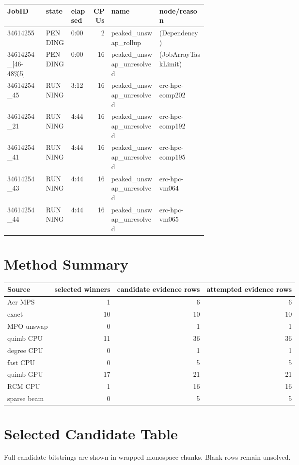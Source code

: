 \documentclass[10pt]{article}
\begin{document}
\begin{longtable}{l l l r p{0.24\linewidth} p{0.24\linewidth}}
\toprule
JobID & state & elapsed & CPUs & name & node/reason \\
\midrule
34614255 & PENDING & 0:00 & 2 & peaked\_unswap\_rollup & (Dependency) \\
34614254\_[46-48\%5] & PENDING & 0:00 & 16 & peaked\_unswap\_unresolved & (JobArrayTaskLimit) \\
34614254\_45 & RUNNING & 3:12 & 16 & peaked\_unswap\_unresolved & erc-hpc-comp202 \\
34614254\_21 & RUNNING & 4:44 & 16 & peaked\_unswap\_unresolved & erc-hpc-comp192 \\
34614254\_41 & RUNNING & 4:44 & 16 & peaked\_unswap\_unresolved & erc-hpc-comp195 \\
34614254\_43 & RUNNING & 4:44 & 16 & peaked\_unswap\_unresolved & erc-hpc-vm064 \\
34614254\_44 & RUNNING & 4:44 & 16 & peaked\_unswap\_unresolved & erc-hpc-vm065 \\
\bottomrule
\end{longtable}

\section*{Method Summary}
\begin{longtable}{l r r r}
\toprule
Source & selected winners & candidate evidence rows & attempted evidence rows \\
\midrule
Aer MPS & 1 & 6 & 6 \\
exact & 10 & 10 & 10 \\
MPO unswap & 0 & 1 & 1 \\
quimb CPU & 11 & 36 & 36 \\
degree CPU & 0 & 1 & 1 \\
fast CPU & 0 & 5 & 5 \\
quimb GPU & 17 & 21 & 21 \\
RCM CPU & 1 & 16 & 16 \\
sparse beam & 0 & 5 & 5 \\
\bottomrule
\end{longtable}

\section*{Selected Candidate Table}
Full candidate bitstrings are shown in wrapped monospace chunks. Blank rows remain unsolved.
\end{document}
